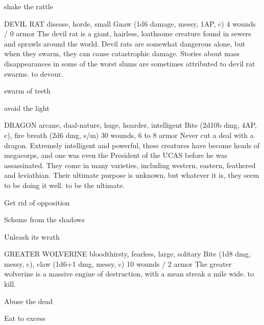 \documentclass[oneside,10pt]{article}
\begin{document}
\begin{multicols}{2}
{\tcirc{} shake the rattle}

\critterspec
{DEVIL RAT	}
{disease, horde, small}
{Gnaw (1d6 damage, messy, 1AP, c)}
{4 wounds / 0 armor}
{The devil rat is a giant, hairless, loathsome creature found in sewers and sprawls around the world. Devil rats are somewhat dangerous alone, but when they swarm, they can cause catastrophic damage. Stories about mass disappearances in some of the worst slums are sometimes attributed to devil rat swarms.}
{to devour.}
{\tcirc{} swarm of teeth

\tcirc{} avoid the light}

\critterspec
{DRAGON	}
{arcane, dual-nature, huge, hoarder, intelligent}
{Bite (2d10b dmg, 4AP, c), fire breath (2d6 dmg, s/m)}
{30 wounds, 6 to 8 armor}
{Never cut a deal with a dragon. Extremely intelligent and powerful, these creatures have become heads of megacorps, and one was even the President of the UCAS before he was assassinated. They come in many varieties, including western, eastern, feathered and leviathian. Their ultimate purpose is unknown, but whatever it is, they seem to be doing it well.}
{to be the ultimate.}
{\tcirc{} Get rid of opposition

\tcirc{} Scheme from the shadows

\tcirc{} Unleash its wrath}

\critterspec
{GREATER WOLVERINE	}
{bloodthirsty, fearless, large, solitary}
{Bite (1d8 dmg, messy, c), claw (1d6+1 dmg, messy, c)}
{10 wounds / 2 armor}
{The greater wolverine is a massive engine of destruction, with a mean streak a mile wide. }
{to kill.}
{\tcirc{} Abuse the dead

\tcirc{} Eat to excess}

\end{multicols}

\newpage
\end{document}
